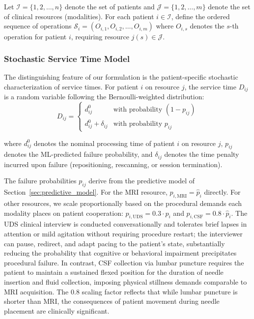 \documentclass[11pt,a4paper]{article}
\begin{document}
Let $\mathcal{I} = \{1, 2, \ldots, n\}$ denote the set of patients and $\mathcal{J} = \{1, 2, \ldots, m\}$ denote the set of clinical resources (modalities). For each patient $i \in \mathcal{I}$, define the ordered sequence of operations $\mathcal{S}_i = (O_{i,1}, O_{i,2}, \ldots, O_{i,m})$ where $O_{i,s}$ denotes the $s$-th operation for patient $i$, requiring resource $j(s) \in \mathcal{J}$.

\subsubsection{Stochastic Service Time Model}

The distinguishing feature of our formulation is the patient-specific stochastic characterization of service times. For patient $i$ on resource $j$, the service time $D_{ij}$ is a random variable following the Bernoulli-weighted distribution:
\begin{equation}
D_{ij} = 
\begin{cases}
d_{ij}^0 & \text{with probability } (1 - p_{ij}) \\
d_{ij}^0 + \delta_{ij} & \text{with probability } p_{ij}
\end{cases}
\label{eq:service_time_rv}
\end{equation}

where $d_{ij}^0$ denotes the nominal processing time of patient $i$ on resource $j$, $p_{ij}$ denotes the ML-predicted failure probability, and $\delta_{ij}$ denotes the time penalty incurred upon failure (repositioning, rescanning, or session termination).

The failure probabilities $p_{ij}$ derive from the predictive model of Section~\ref{sec:predictive_model}. For the MRI resource, $p_{i,\text{MRI}} = \hat{p}_i$ directly. For other resources, we scale proportionally based on the procedural demands each modality places on patient cooperation: $p_{i,\text{UDS}} = 0.3 \cdot \hat{p}_i$ and $p_{i,\text{CSF}} = 0.8 \cdot \hat{p}_i$. The UDS clinical interview is conducted conversationally and tolerates brief lapses in attention or mild agitation without requiring procedure restart; the interviewer can pause, redirect, and adapt pacing to the patient's state, substantially reducing the probability that cognitive or behavioral impairment precipitates procedural failure. In contrast, CSF collection via lumbar puncture requires the patient to maintain a sustained flexed position for the duration of needle insertion and fluid collection, imposing physical stillness demands comparable to MRI acquisition. The 0.8 scaling factor reflects that while lumbar puncture is shorter than MRI, the consequences of patient movement during needle placement are clinically significant.
\end{document}

